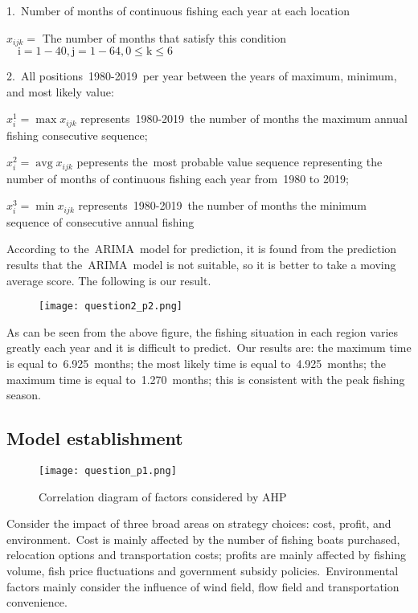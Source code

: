 \documentclass{mcmthesis}
\begin{document}
1. Number of months of continuous fishing each year at each location

$x_{i j k}=$ The number of months that satisfy this condition $\quad \mathrm{i}=1-40, \mathrm{j}=1-64,0 \leq \mathrm{k} \leq 6$

2. All positions 1980-2019 per year between the years of maximum, minimum, and most likely value:

$x_{i}^{1}=\max x_{i j k}$ represents 1980-2019 the number of months the maximum annual fishing consecutive sequence;

$x^{2}_{i}=\operatorname{avg} x_{i j k}$ pepresents the most probable value sequence representing the number of months of continuous fishing each year from 1980 to 2019;

$x^{3}_{i}=\min x_{i j k}$ represents 1980-2019 the number of months the minimum sequence of consecutive annual fishing

According to the ARIMA model for prediction, it is found from the prediction results that the ARIMA model is not suitable, so it is better to take a moving average score. The following is our result.

\begin{figure}[!htp]
	\centering
	\texttt{[image: question2\_p2.png]}\\
\end{figure}

As can be seen from the above figure, the fishing situation in each region varies greatly each year and it is difficult to predict. Our results are: the maximum time is equal to 6.925 months; the most likely time is equal to 4.925 months; the maximum time is equal to 1.270 months; this is consistent with the peak fishing season.

\subsection{Model establishment}

\begin{figure}[!htp]
	\centering
	\texttt{[image: question\_p1.png]}\\
	\caption{Correlation diagram of factors considered by AHP}
\end{figure}

Consider the impact of three broad areas on strategy choices: cost, profit, and environment. Cost is mainly affected by the number of fishing boats purchased, relocation options and transportation costs; profits are mainly affected by fishing volume, fish price fluctuations and government subsidy policies. Environmental factors mainly consider the influence of wind field, flow field and transportation convenience.
\end{document}
